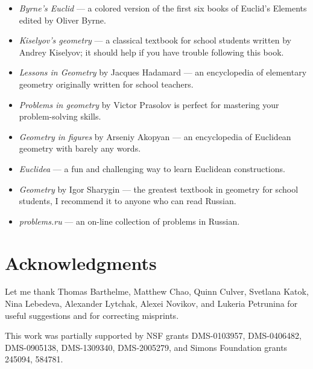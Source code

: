 \begin{itemize}
\item {}\emph{Byrne's Euclid} \cite{byrne} --- a colored version of the first six books of Euclid's Elements edited by Oliver Byrne. 

\item {}\emph{Kiselyov's geometry} \cite{kiselev} ---
a classical textbook for school students written by Andrey Kiselyov; it should help if you have trouble following this book.

\item {}\emph{Lessons in Geometry} by Jacques Hadamard \cite{hadamard} --- an encyclopedia of elementary geometry originally written for school teachers.



\item {}\emph{Problems in geometry} by Victor Prasolov\cite{prasolov}  is perfect for mastering your problem-solving skills.

\item {}\emph{Geometry in figures} by Arseniy Akopyan \cite{akopyan} --- an encyclopedia of Euclidean geometry with barely any words.

\item {}\emph{Euclidea} \cite{euclidea} --- a fun and challenging way to learn Euclidean constructions.
 
\item {}\emph{Geometry} by Igor Sharygin \cite{sharygin} --- the greatest textbook in geometry for school students, I recommend it to anyone who can read Russian.

\item {}\emph{problems.ru} \cite{zadachi} --- an on-line collection of problems in Russian.

\end{itemize}

\section{Acknowledgments}

{\sloppy

Let me thank 
Thomas Barthelme,
Matthew Chao, 
Quinn Culver,
Svetlana Katok, 
Nina Lebedeva,
Alexander Lytchak,
Alexei Novikov,
and Lukeria Petrunina
for useful suggestions and for correcting misprints.

This work was partially supported by
NSF grants
DMS-0103957,
DMS-0406482,
DMS-0905138,
DMS-1309340,
DMS-2005279,
and Simons Foundation grants 
245094, 584781.

}
